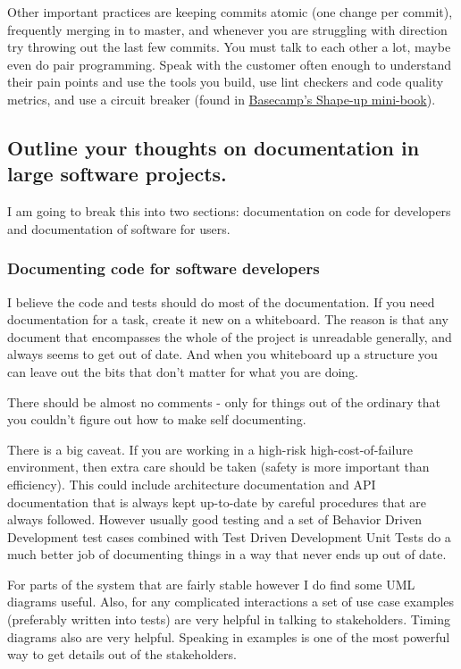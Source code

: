 \documentclass[letter,12pt]{article}
\begin{document}
Other important practices are keeping commits atomic (one change per commit), frequently merging in to master, and whenever you are struggling with direction try throwing out the last few commits. You must talk to each other a lot, maybe even do pair programming. Speak with the customer often enough to understand their pain points and use the tools you build, use lint checkers and code quality metrics, and use a circuit breaker (found in \href{https://basecamp.com/shapeup/2.2-chapter-08#the-circuit-breaker}{Basecamp's Shape-up mini-book}).



\subsection{Outline your thoughts on documentation in large software projects.}

I am going to break this into two sections: documentation on code for developers and documentation of software for users.
\subsubsection{Documenting code for software developers}
I believe the code and tests should do most of the documentation. If you need documentation for a task, create it new on a whiteboard. The reason is that any document that encompasses the whole of the project is unreadable generally, and always seems to get out of date. And when you whiteboard up a structure you can leave out the bits that don't matter for what you are doing.

There should be almost no comments - only for things out of the ordinary that you couldn't figure out how to make self documenting.

There is a big caveat. If you are working in a high-risk high-cost-of-failure environment, then extra care should be taken (safety is more important than efficiency). This could include architecture documentation and API documentation that is always kept up-to-date by careful procedures that are always followed. However usually good testing and a set of Behavior Driven Development test cases combined with Test Driven Development Unit Tests do a much better job of documenting things in a way that never ends up out of date.

For parts of the system that are fairly stable however I do find some UML diagrams useful. Also, for any complicated interactions a set of use case examples (preferably written into tests) are very helpful in talking to stakeholders. Timing diagrams also are very helpful. Speaking in examples is one of the most powerful way to get details out of the stakeholders.
\end{document}
